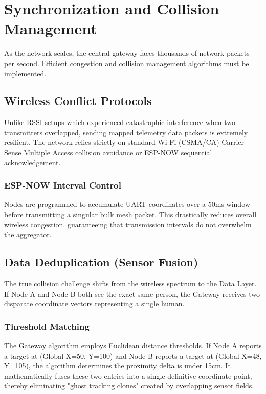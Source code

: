 \section{Synchronization and Collision Management}
\label{sec:synchronization}

As the network scales, the central gateway faces thousands of network packets per second. Efficient congestion and collision management algorithms must be implemented.

\subsection{Wireless Conflict Protocols}
\label{subsec:time-slot-protocol}

Unlike RSSI setups which experienced catastrophic interference when two transmitters overlapped, sending mapped telemetry data packets is extremely resilient. The network relies strictly on standard Wi-Fi (CSMA/CA) Carrier-Sense Multiple Access collision avoidance or ESP-NOW sequential acknowledgement. 

\subsubsection{ESP-NOW Interval Control}
\label{subsubsec:time-slot-allocation}

Nodes are programmed to accumulate UART coordinates over a 50ms window before transmitting a singular bulk mesh packet. This drastically reduces overall wireless congestion, guaranteeing that transmission intervals do not overwhelm the aggregator.

\subsection{Data Deduplication (Sensor Fusion)}
\label{subsec:unique-node-id}

The true collision challenge shifts from the wireless spectrum to the Data Layer. If Node A and Node B both see the exact same person, the Gateway receives two disparate coordinate vectors representing a single human.

\subsubsection{Threshold Matching}
\label{subsubsec:interval-control}

The Gateway algorithm employs Euclidean distance thresholds. If Node A reports a target at (Global X=50, Y=100) and Node B reports a target at (Global X=48, Y=105), the algorithm determines the proximity delta is under 15cm. It mathematically fuses these two entries into a single definitive coordinate point, thereby eliminating "ghost tracking clones" created by overlapping sensor fields.

